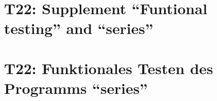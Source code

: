 
\thispagestyle{empty}
\ifenglish
\section*{T22: Supplement ``Funtional testing'' and ``series''}

\fi
\ifgerman
\section*{T22: Funktionales Testen des Programms "`series"'}

\fi


